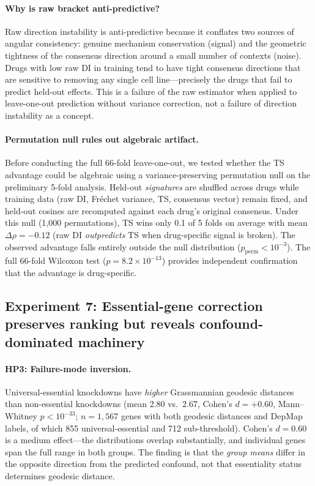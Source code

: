 \documentclass{article}
\begin{document}
\paragraph{Why is raw bracket anti-predictive?}
Raw direction instability is anti-predictive because it conflates two
sources of angular consistency: genuine mechanism conservation (signal)
and the geometric tightness of the consensus direction around a small
number of contexts (noise). Drugs with low raw DI in training tend to
have tight consensus directions that are sensitive to removing any single
cell line---precisely the drugs that fail to predict held-out effects.
This is a failure of the raw estimator when applied to leave-one-out
prediction without variance correction, not a failure of direction
instability as a concept.

\paragraph{Permutation null rules out algebraic artifact.}
Before conducting the full 66-fold leave-one-out, we tested whether the
TS advantage could be algebraic using a variance-preserving permutation
null on the preliminary 5-fold analysis. Held-out
\emph{signatures} are shuffled across drugs while training data
(raw DI, Fr\'echet variance, TS, consensus vector) remain fixed,
and held-out cosines are recomputed against each drug's original
consensus. Under this null (1{,}000 permutations),
TS wins only 0.1 of 5 folds on average with mean $\Delta\rho = -0.12$
(raw DI \emph{outpredicts} TS when drug-specific signal is broken).
The observed advantage falls entirely outside the null distribution
($p_{\text{perm}} < 10^{-3}$). The full 66-fold Wilcoxon test
($p = 8.2 \times 10^{-13}$) provides independent confirmation that the
advantage is drug-specific.

\subsection{Experiment 7: Essential-gene correction preserves ranking
but reveals confound-dominated machinery}

\paragraph{HP3: Failure-mode inversion.}
Universal-essential knockdowns have \emph{higher} Grassmannian geodesic
distances than non-essential knockdowns (mean 2.80 vs.\ 2.67, Cohen's $d =
+0.60$, Mann--Whitney $p < 10^{-33}$; $n = 1{,}567$ genes with both
geodesic distances and DepMap labels, of which 855 universal-essential and
712 sub-threshold). Cohen's $d = 0.60$ is a medium effect---the
distributions overlap substantially, and individual genes span the full
range in both groups. The finding is that the \emph{group means} differ
in the opposite direction from the predicted confound, not that essentiality
status determines geodesic distance.
\end{document}
